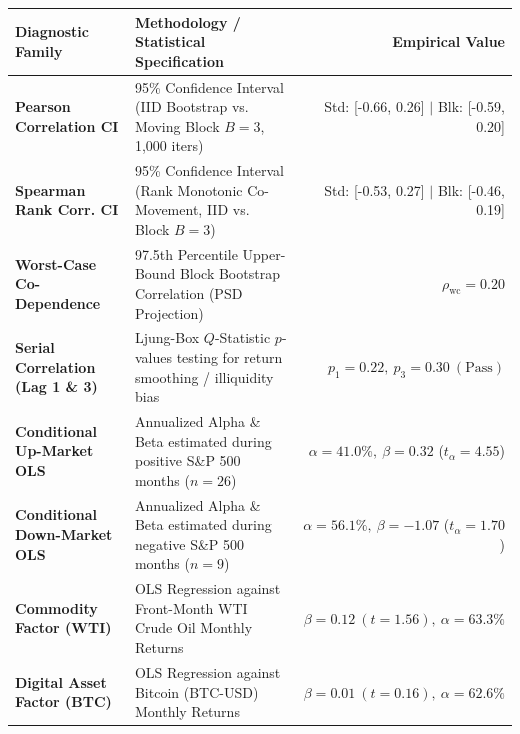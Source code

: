 \documentclass[10pt,a4paper]{article}
\begin{document}
\vspace{0.45em}

\begin{tcolorbox}[colback=white, colframe=primary, title=\textbf{\small\strut Appendix A: Extended Statistical, Bootstrap \& Factor Diagnostics}, fonttitle=\sffamily\bfseries\small, arc=5pt, boxrule=0.8pt, toptitle=4pt, bottomtitle=4pt, left=6pt, right=6pt, top=3.5pt, bottom=3.5pt, colbacktitle=primary]
\renewcommand{\arraystretch}{1.22}
\scriptsize
\begin{tabularx}{\textwidth}{l X r}
\toprule
\textbf{\textcolor{primary}{Diagnostic Family}} & \textbf{\textcolor{primary}{Methodology / Statistical Specification}} & \textbf{\textcolor{primary}{Empirical Value}} \\
\midrule
\textbf{Pearson Correlation CI} & 95\% Confidence Interval (IID Bootstrap vs. Moving Block $B=3$, 1,000 iters) & Std: [-0.66, 0.26] $\vert$ Blk: [-0.59, 0.20] \\
\rowcolor{cardbg} \textbf{Spearman Rank Corr. CI} & 95\% Confidence Interval (Rank Monotonic Co-Movement, IID vs. Block $B=3$) & Std: [-0.53, 0.27] $\vert$ Blk: [-0.46, 0.19] \\
\textbf{Worst-Case Co-Dependence} & 97.5th Percentile Upper-Bound Block Bootstrap Correlation (PSD Projection) & $\rho_{\text{wc}} = 0.20$ \\
\rowcolor{cardbg} \textbf{Serial Correlation (Lag 1 \& 3)} & Ljung-Box $Q$-Statistic $p$-values testing for return smoothing / illiquidity bias & $p_1=0.22,\ p_3=0.30\ (\text{Pass})$ \\
\textbf{Conditional Up-Market OLS} & Annualized Alpha \& Beta estimated during positive S\&P 500 months ($n=26$) & $\alpha=41.0\%,\ \beta=0.32$ ($t_\alpha=4.55$) \\
\rowcolor{cardbg} \textbf{Conditional Down-Market OLS} & Annualized Alpha \& Beta estimated during negative S\&P 500 months ($n=9$) & $\alpha=56.1\%,\ \beta=-1.07$ ($t_\alpha=1.70$) \\
\textbf{Commodity Factor (WTI)} & OLS Regression against Front-Month WTI Crude Oil Monthly Returns & $\beta=0.12\ (t=1.56),\ \alpha=63.3\%$ \\
\rowcolor{cardbg} \textbf{Digital Asset Factor (BTC)} & OLS Regression against Bitcoin (BTC-USD) Monthly Returns & $\beta=0.01\ (t=0.16),\ \alpha=62.6\%$ \\
\bottomrule
\end{tabularx}
\end{tcolorbox}
\end{document}
